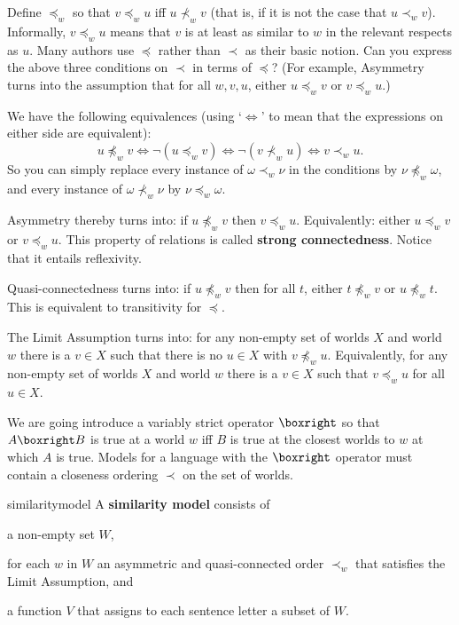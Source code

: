 \begin{exercise}
  Define $\preceq_{w}$ so that $v \preceq_w u$ iff $u \nprec_w v$ (that is, if
  it is not the case that $u \prec_{w} v$). Informally, $v \preceq_w u$ means
  that $v$ is at least as similar to $w$ in the relevant respects as $u$. Many
  authors use $\preceq$ rather than $\prec$ as their basic notion. Can you
  express the above three conditions on $\prec$ in terms of $\preceq$? (For
  example, Asymmetry turns into the assumption that for all $w,v,u$, either
  $u \preceq_{w} v$ or $v \preceq_{w} u$.)
\end{exercise}
\begin{solution}
  We have the following equivalences (using `$\Leftrightarrow$' to mean that the
  expressions on either side are equivalent):
  \[
    u \npreceq_w v \Leftrightarrow \neg (u \preceq_w v) \Leftrightarrow \neg(v \nprec_w u) \Leftrightarrow v \prec_w u.
  \]
  So you can simply replace every instance of $\omega \prec_{w} \nu$ in the
  conditions by $\nu \npreceq_{w} \omega$, and every instance of
  $\omega \nprec_{w} \nu$ by $\nu \preceq_{w} \omega$.

  Asymmetry thereby turns into: if $u \npreceq_{w} v$ then $v \preceq_{w} u$.
  Equivalently: either $u \preceq_{w} v$ or $v \preceq_{w} u$. This
  property of relations is called \textbf{strong connectedness}. Notice that it
  entails reflexivity.

  Quasi-connectedness turns into: if $u \npreceq_{w} v$ then for all $t$, either
  $t \npreceq_{w} v$ or $u \npreceq_{w} t$. This is equivalent to transitivity
  for $\preceq$.


  The Limit Assumption turns into: for any non-empty set of worlds $X$ and world
  $w$ there is a $v\in X$ such that there is no $u \in X$ with
  $v \npreceq_{w} u$. Equivalently, for any non-empty set of worlds $X$
  and world $w$ there is a $v\in X$ such that $v \preceq_{w} u$ for all $u\in X$.
\end{solution}

We are going introduce a variably strict operator $\boxright$ so that
$A\boxright B$ is true at a world $w$ iff $B$ is true at the closest worlds to
$w$ at which $A$ is true. Models for a language with the $\boxright$ operator
must contain a closeness ordering $\prec$ on the set of worlds.

\begin{definition}{}{similaritymodel}
  A \textbf{similarity model} consists of
  \vspace{-3mm}
  \begin{itemize*}
  \item a non-empty set $W$,
  \item for each $w$ in $W$ an asymmetric and quasi-connected order $\prec_w$
  that satisfies the Limit Assumption, and
  \item a function $V$ that assigns to each sentence letter a subset of $W$.
  \end{itemize*}
\end{definition}

